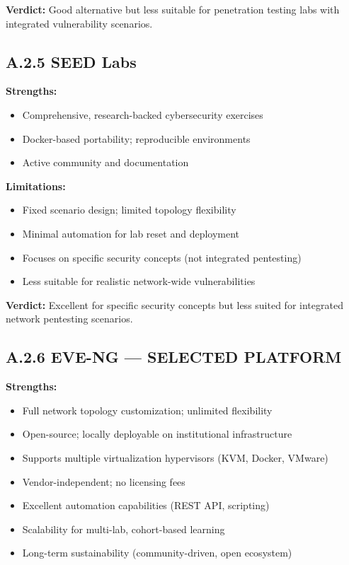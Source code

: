 \textbf{Verdict:} Good alternative but less suitable for penetration testing labs with integrated vulnerability scenarios.


\subsection*{A.2.5 SEED Labs}


\textbf{Strengths:}
\begin{itemize}
    \item Comprehensive, research-backed cybersecurity exercises
    \item Docker-based portability; reproducible environments
    \item Active community and documentation
\end{itemize}


\textbf{Limitations:}
\begin{itemize}
    \item Fixed scenario design; limited topology flexibility
    \item Minimal automation for lab reset and deployment
    \item Focuses on specific security concepts (not integrated pentesting)
    \item Less suitable for realistic network-wide vulnerabilities
\end{itemize}


\textbf{Verdict:} Excellent for specific security concepts but less suited for integrated network pentesting scenarios.


\subsection*{A.2.6 EVE-NG --- SELECTED PLATFORM}


\textbf{Strengths:}
\begin{itemize}
    \item Full network topology customization; unlimited flexibility
    \item Open-source; locally deployable on institutional infrastructure
    \item Supports multiple virtualization hypervisors (KVM, Docker, VMware)
    \item Vendor-independent; no licensing fees
    \item Excellent automation capabilities (REST API, scripting)
    \item Scalability for multi-lab, cohort-based learning
    \item Long-term sustainability (community-driven, open ecosystem)
\end{itemize}


